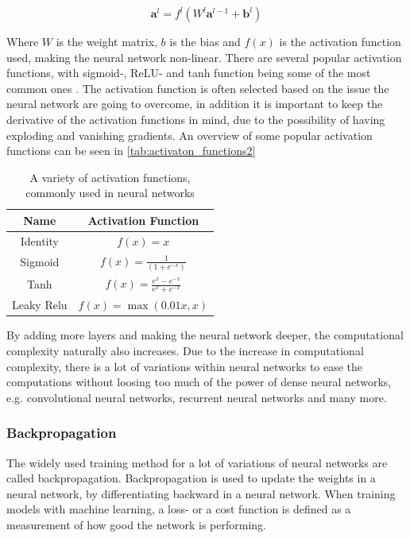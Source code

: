 \documentclass[../main.tex]{subfiles}
\begin{document}
\begin{equation}
    \boldsymbol{a}^l=f^l(W^l\boldsymbol{a}^{l-1}+\boldsymbol{b}^l)
\label{eq:activation}
\end{equation}

Where \ensuremath{W} is the weight matrix, $b$ is the bias and \ensuremath{f(x)} is the activation function used, making the neural network non-linear. There are several popular activation functions, with sigmoid-, ReLU- and tanh function being some of the most common ones \cite{activation_cunctions_citation}. The activation function is often selected based on the issue the neural network are going to overcome, in addition it is important to keep the derivative of the activation functions in mind, due to the possibility of having exploding and vanishing gradients. An overview of some popular activation functions can be seen in \autoref{tab:activaton_functions2}

\begin{table}[h!]
\centering
\caption{A variety of activation functions, commonly used in neural networks}
\begin{tabular}{c c} 
\hline
Name  & Activation Function \\
\hline
Identity  & $f(x)=x$ \\
Sigmoid  & $f(x)=\frac{1}{(1+e^{-x})}$ \\
Tanh  & $f(x)=\frac{e^x-e^{-x}}{e^x+e^{-x}} $ \\
Leaky Relu  & $f(x)=\max(0.01x, x)$ \\
\end{tabular}
\label{tab:activaton_functions2}
\end{table}

By adding more layers and making the neural network deeper, the computational complexity naturally also increases. Due to the increase in computational complexity, there is a lot of variations within neural networks to ease the computations without loosing too much of the power of dense neural networks, e.g. convolutional neural networks, recurrent neural networks and many more.

\subsubsection{Backpropagation}
The widely used training method for a lot of variations of neural networks are called backpropagation. Backpropagation is used to update the weights in a neural network, by differentiating backward in a neural network. When training models with machine learning, a loss- or a cost function is defined as a measurement of how good the network is performing.
\end{document}
